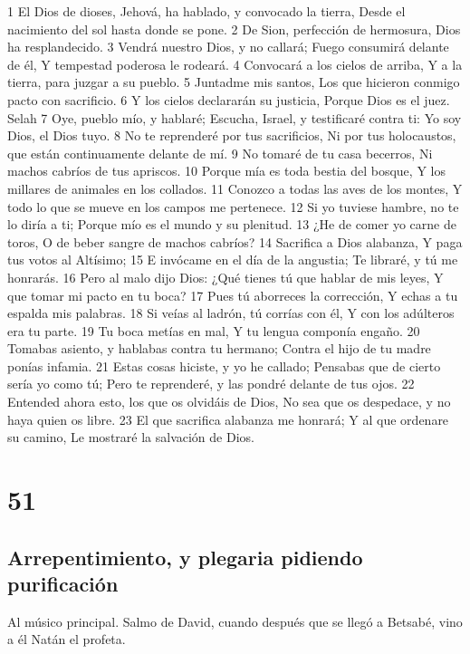 1 El Dios de dioses, Jehová, ha hablado, y convocado la tierra,
Desde el nacimiento del sol hasta donde se pone.
2 De Sion, perfección de hermosura,
Dios ha resplandecido.
3 Vendrá nuestro Dios, y no callará;
Fuego consumirá delante de él,
Y tempestad poderosa le rodeará.
4 Convocará a los cielos de arriba,
Y a la tierra, para juzgar a su pueblo.
5 Juntadme mis santos,
Los que hicieron conmigo pacto con sacrificio.
6 Y los cielos declararán su justicia,
Porque Dios es el juez. Selah
7 Oye, pueblo mío, y hablaré;
Escucha, Israel, y testificaré contra ti:
Yo soy Dios, el Dios tuyo.
8 No te reprenderé por tus sacrificios,
Ni por tus holocaustos, que están continuamente delante de mí.
9 No tomaré de tu casa becerros,
Ni machos cabríos de tus apriscos.
10 Porque mía es toda bestia del bosque,
Y los millares de animales en los collados.
11 Conozco a todas las aves de los montes,
Y todo lo que se mueve en los campos me pertenece.
12 Si yo tuviese hambre, no te lo diría a ti;
Porque mío es el mundo y su plenitud.
13 ¿He de comer yo carne de toros,
O de beber sangre de machos cabríos?
14 Sacrifica a Dios alabanza,
Y paga tus votos al Altísimo;
15 E invócame en el día de la angustia;
Te libraré, y tú me honrarás.
16 Pero al malo dijo Dios:
¿Qué tienes tú que hablar de mis leyes,
Y que tomar mi pacto en tu boca?
17 Pues tú aborreces la corrección,
Y echas a tu espalda mis palabras.
18 Si veías al ladrón, tú corrías con él,
Y con los adúlteros era tu parte.
19 Tu boca metías en mal,
Y tu lengua componía engaño.
20 Tomabas asiento, y hablabas contra tu hermano;
Contra el hijo de tu madre ponías infamia.
21 Estas cosas hiciste, y yo he callado;
Pensabas que de cierto sería yo como tú;
Pero te reprenderé, y las pondré delante de tus ojos.
22 Entended ahora esto, los que os olvidáis de Dios,
No sea que os despedace, y no haya quien os libre.
23 El que sacrifica alabanza me honrará;
Y al que ordenare su camino,
Le mostraré la salvación de Dios.

\chapter{51}

\section*{Arrepentimiento, y plegaria pidiendo purificación}

Al músico principal. Salmo de David, cuando después que se llegó a Betsabé, vino a él Natán el profeta.

